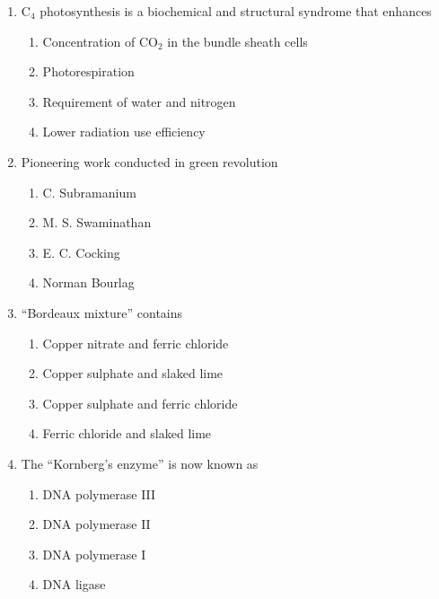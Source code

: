 \documentclass[journal,12pt,onecolumn]{IEEEtran}
\begin{document}
\begin{enumerate}
\item C$_4$ photosynthesis is a biochemical and structural syndrome that enhances
\begin{multicols}{2}
\begin{enumerate}[label=(\Alph*)]
    \item Concentration of CO$_2$ in the bundle sheath cells
    \item Photorespiration
    \item Requirement of water and nitrogen
    \item Lower radiation use efficiency
\end{enumerate}
\end{multicols}

\item Pioneering work conducted in green revolution
\begin{multicols}{2}
\begin{enumerate}[label=(\Alph*)]
    \item C. Subramanium
    \item M. S. Swaminathan
    \item E. C. Cocking
    \item Norman Bourlag
\end{enumerate}
\end{multicols}

\item ``Bordeaux mixture'' contains
\begin{multicols}{2}
\begin{enumerate}[label=(\Alph*)]
    \item Copper nitrate and ferric chloride
    \item Copper sulphate and slaked lime
    \item Copper sulphate and ferric chloride
    \item Ferric chloride and slaked lime
\end{enumerate}
\end{multicols}

\item The ``Kornberg's enzyme'' is now known as
\begin{multicols}{2}
\begin{enumerate}[label=(\Alph*)]
    \item DNA polymerase III
    \item DNA polymerase II
    \item DNA polymerase I
    \item DNA ligase
\end{enumerate}
\end{multicols}


\end{enumerate}
\end{document}
